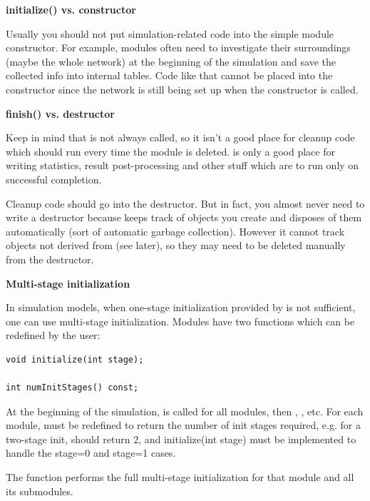 \textbf{initialize() vs. constructor}


Usually you should not put simulation-related code into the
simple module constructor. For
example, modules often need to investigate their surroundings (maybe
the whole network) at the beginning of the simulation and save the
collected info into internal tables.  Code like that cannot be placed
into the constructor since the network is still being set up when the
constructor is called.


\textbf{finish() vs. destructor}


Keep in mind that  is not always called, so it isn't a
good place for cleanup code which should run every time the module is
deleted.  is only a good place for writing statistics,
result post-processing and other stuff which are to run only on
successful completion.

Cleanup code should go into the destructor. But in
fact, you almost never need to write a destructor because {\opp}
keeps track of objects you create and disposes of them automatically
(sort of automatic garbage collection). However it cannot track
objects not derived from  (see later), so they may
need to be deleted manually from the destructor.


\textbf{Multi-stage initialization}


In simulation models, when one-stage
initialization provided by 
is not sufficient, one can use multi-stage
initialization.  Modules have two
functions which can be redefined by the user:

\begin{verbatim}
void initialize(int stage);

int numInitStages() const;
\end{verbatim}

At the beginning of the simulation, 
is called for all modules, then ,
, etc. For each module,
 must be redefined to return the number of init
stages required, e.g. for a two-stage init, 
should return 2, and initialize(int stage) must be implemented to
handle the stage=0 and stage=1 cases.


The  function performs the full multi-stage initialization
for that module and all its submodules.

